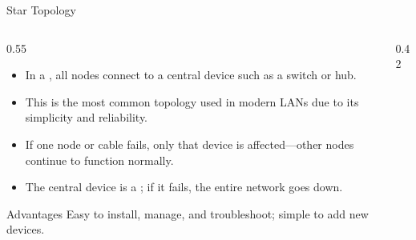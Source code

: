 \documentclass[aspectratio=169]{beamer}  %
\begin{document}
\begin{frame}{Star Topology}
    \begin{columns}[T]
        \begin{column}{0.55\textwidth}
            \begin{itemize}
                \item In a , all nodes connect to a central device such as a switch or hub.
                \item This is the most common topology used in modern LANs due to its simplicity and reliability.
                \item If one node or cable fails, only that device is affected---other nodes continue to function normally.
                \item The central device is a ; if it fails, the entire network goes down.
            \end{itemize}
            
            \vspace{0.3em}
            \begin{exampleblock}{Advantages}
                Easy to install, manage, and troubleshoot; simple to add new devices.
            \end{exampleblock}
        \end{column}
        \begin{column}{0.42\textwidth}
            \begin{center}
\end{center}
\end{column}
\end{columns}
\end{frame}
\end{document}
